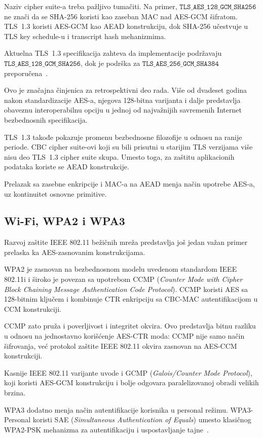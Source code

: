 Naziv cipher suite-a treba pažljivo tumačiti. Na primer,
$\texttt{TLS\_AES\_128\_GCM\_SHA256}$
ne znači da se SHA-256 koristi kao zaseban MAC nad AES-GCM
šifratom. TLS~1.3 koristi AES-GCM kao AEAD konstrukciju, dok
SHA-256 učestvuje u TLS key schedule-u i transcript hash
mehanizmima.

Aktuelna TLS~1.3 specifikacija zahteva da implementacije podržavaju
$\texttt{TLS\_AES\_128\_GCM\_SHA256}$,
dok je podrška za
$\texttt{TLS\_AES\_256\_GCM\_SHA384}$
preporučena~\cite{rfc9846}.

Ovo je značajna činjenica za retrospektivni deo rada. Više od dvadeset
godina nakon standardizacije AES-a, njegova 128-bitna varijanta i dalje
predstavlja obaveznu interoperabilnu opciju u jednoj od najvažnijih
savremenih Internet bezbednosnih specifikacija.

TLS~1.3 takođe pokazuje promenu bezbednosne filozofije u odnosu na
ranije periode. CBC cipher suite-ovi koji su bili prisutni u starijim
TLS verzijama više nisu deo TLS~1.3 cipher suite skupa. Umesto toga,
za zaštitu aplikacionih podataka koriste se AEAD konstrukcije.

Prelazak sa zasebne enkripcije i MAC-a na AEAD menja način upotrebe
AES-a, uz kontinuitet osnovne primitive.

\subsection{Wi-Fi, WPA2 i WPA3}
\label{subsec:wifi}

Razvoj zaštite IEEE 802.11 bežičnih mreža predstavlja još jedan važan
primer prelaska ka AES-zasnovanim konstrukcijama.

WPA2 je zasnovan na bezbednosnom modelu uvedenom standardom IEEE
802.11i i široko je povezan sa upotrebom CCMP
(\emph{Counter Mode with Cipher Block Chaining Message Authentication
Code Protocol}). CCMP koristi AES sa 128-bitnim ključem i kombinuje
CTR enkripciju sa CBC-MAC autentifikacijom u CCM konstrukciji.

CCMP zato pruža i poverljivost i integritet okvira. Ovo predstavlja
bitnu razliku u odnosu na jednostavno korišćenje AES-CTR moda:
CCMP nije samo način šifrovanja, već protokol zaštite IEEE 802.11
okvira zasnovan na AES-CCM konstrukciji.

Kasnije IEEE 802.11 varijante uvode i GCMP
(\emph{Galois/Counter Mode Protocol}), koji koristi AES-GCM
konstrukciju i bolje odgovara paralelizovanoj obradi velikih brzina.

WPA3 dodatno menja način autentifikacije korisnika u personal režimu.
WPA3-Personal koristi SAE (\emph{Simultaneous Authentication of Equals})
umesto klasičnog WPA2-PSK mehanizma za autentifikaciju i uspostavljanje
tajne~\cite{rfc7664,wifi-wpa3}.

